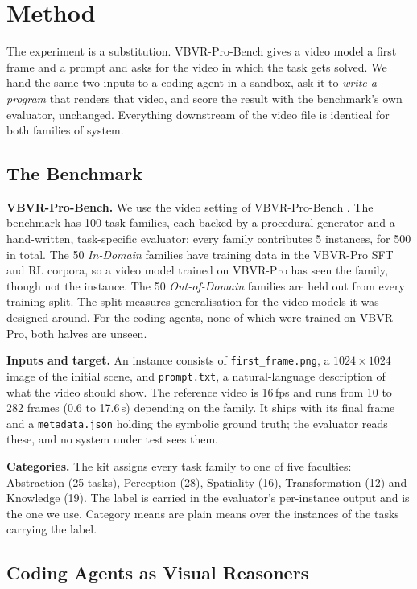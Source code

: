 \section{Method}
\label{sec:method}

The experiment is a substitution. VBVR-Pro-Bench gives a video model a first frame and a prompt and asks for the video in which the task gets solved. We hand the same two inputs to a coding agent in a sandbox, ask it to \emph{write a program} that renders that video, and score the result with the benchmark's own evaluator, unchanged. Everything downstream of the video file is identical for both families of system.

\subsection{The Benchmark}
\label{sec:bench}

\textbf{VBVR-Pro-Bench.} We use the video setting of VBVR-Pro-Bench \citep{vbvrpro2026}. The benchmark has 100 task families, each backed by a procedural generator and a hand-written, task-specific evaluator; every family contributes 5 instances, for 500 in total. The 50 \emph{In-Domain} families have training data in the VBVR-Pro SFT and RL corpora, so a video model trained on VBVR-Pro has seen the family, though not the instance. The 50 \emph{Out-of-Domain} families are held out from every training split. The split measures generalisation for the video models it was designed around. For the coding agents, none of which were trained on VBVR-Pro, both halves are unseen.

\textbf{Inputs and target.} An instance consists of \texttt{first\_frame.png}, a $1024\times1024$ image of the initial scene, and \texttt{prompt.txt}, a natural-language description of what the video should show. The reference video is 16\,fps and runs from 10 to 282 frames (0.6 to 17.6\,s) depending on the family. It ships with its final frame and a \texttt{metadata.json} holding the symbolic ground truth; the evaluator reads these, and no system under test sees them.

\textbf{Categories.} The kit assigns every task family to one of five faculties: Abstraction (25 tasks), Perception (28), Spatiality (16), Transformation (12) and Knowledge (19). The label is carried in the evaluator's per-instance output and is the one we use. Category means are plain means over the instances of the tasks carrying the label.

\subsection{Coding Agents as Visual Reasoners}
\label{sec:protocol}

